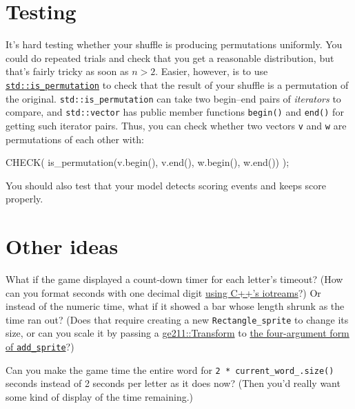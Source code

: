 \documentclass{tufte-handout}
\begin{document}
\section{Testing}

It's hard testing whether your shuffle is producing permutations
uniformly. You could do repeated trials and check that you get a
reasonable distribution, but that's fairly tricky as soon as $n > 2$.
Easier, however, is to use
\href{https://en.cppreference.com/w/cpp/algorithm/is_permutation}
{\texttt{std::is_permutation}} to check that the result of your shuffle
is a permutation of the original. \texttt{std::is_permutation} can take
two begin--end pairs of \emph{iterators} to compare, and
\texttt{std::vector} has public member functions \texttt{begin()} and
\texttt{end()} for getting such iterator pairs. Thus, you can check
whether two vectors \texttt{v} and \texttt{w} are permutations of each
other with:

\begin{Code}
    CHECK( is_permutation(v.begin(), v.end(),
                          w.begin(), w.end()) );
\end{Code}

You should also test that your model detects scoring events and keeps
score properly.

\section{Other ideas}

What if the game displayed a count-down timer for each letter's timeout?
(How can you format seconds with one decimal digit
\href{https://en.cppreference.com/w/cpp/io/manip/setprecision}{using
C++'s iotreams}?) Or instead of the numeric time, what if it showed a
bar whose length shrunk as the time ran out? (Does that require creating
a new \texttt{Rectangle_sprite} to change its size, or can you scale it
by passing a
\href{https://tov.github.io/ge211/classge211_1_1geometry_1_1_transform.html}
{ge211::Transform} to
\href{https://tov.github.io/ge211/classge211_1_1_sprite__set.html\#a567a6cc041710e43a2511234590cc8b9}
{the four-argument form of \texttt{add_sprite}}?)

Can you make the game time the entire word for 
\texttt{2 * current_word_.size()} seconds
instead of 2 seconds per letter as it does
now? (Then you'd really want some kind of display of the time
remaining.)
\end{document}
